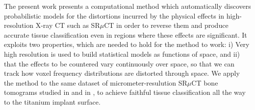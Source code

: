 
The present work presents a computational method which automatically discovers probabilistic
models for the distortions incurred by the physical effects in high-resolution X-ray CT such
as SR$\mu$CT in order to reverse them and produce accurate tissue classification even in regions
where these effects are significant. It exploits two properties, which are needed to hold for
the method to work: i) Very high resolution is used to build statistical models as functions
of space, and ii) that the effects to be countered vary continuously over space, so that we can
track how voxel frequency distributions are distorted through space. We apply the method to the
same dataset of micrometer-resulution SR$\mu$CT bone tomograms studied in \cite{torsten2018}
and in \cite{sporring}, to achieve faithful tissue classification all the way to the titanium
implant surface.


